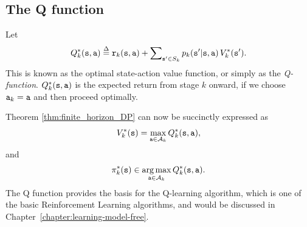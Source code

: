 \subsection{The Q function}
Let
\[{Q^*_k}(\state,\action) \buildrel \Delta \over = {\reward_k}(\state,\action) + \sum\nolimits_{\state' \in {S_k}} {{p_k}(\state'|\state,\action)\,V_k^{*}(\state')} .\]
This is known as the optimal state-action value function, or simply
as the \emph{Q-function}. ${Q^*_k}({\tt s},{\tt a})$ is the expected
return from stage $k$ onward, if we choose ${{\tt a}_k} = {\tt a}$
and then proceed optimally.

Theorem \ref{thm:finite_horizon_DP} can now be succinctly expressed as
\[V_k^{*}({\tt s}) = \mathop {\max }\limits_{{\tt a} \in {\mathcal{A}_k}} {Q^*_k}({\tt s},{\tt a}),\]
and
\[\pi _k^*({\tt s}) \in \mathop {\arg \max }\limits_{{\tt a} \in {\mathcal{A}_k}} {Q^*_k}({\tt s},{\tt a}).\]
The Q function provides the basis for the Q-learning algorithm,
which is one of the basic Reinforcement Learning algorithms, and
would be discussed in Chapter~\ref{chapter:learning-model-free}.


